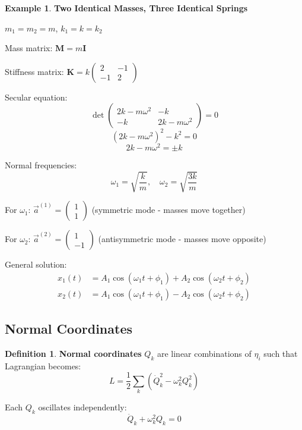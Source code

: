 \documentclass[12pt,a4paper]{article}
\theoremstyle{definition}
\newtheorem{definition}[theorem]{Definition}
\newtheorem{example}[theorem]{Example}
\begin{document}
\begin{example}
\textbf{Two Identical Masses, Three Identical Springs}

$m_1 = m_2 = m$, $k_1 = k = k_2$

Mass matrix: $\mathbf{M} = m\mathbf{I}$

Stiffness matrix: $\mathbf{K} = k\begin{pmatrix} 2 & -1 \\ -1 & 2 \end{pmatrix}$

Secular equation:
\[
\det\begin{pmatrix} 2k - m\omega^2 & -k \\ -k & 2k - m\omega^2 \end{pmatrix} = 0
\]
\[
(2k - m\omega^2)^2 - k^2 = 0
\]
\[
2k - m\omega^2 = \pm k
\]

Normal frequencies:
\[
\omega_1 = \sqrt{\frac{k}{m}}, \quad \omega_2 = \sqrt{\frac{3k}{m}}
\]

For $\omega_1$: $\vec{a}^{(1)} = \begin{pmatrix} 1 \\ 1 \end{pmatrix}$ (symmetric mode - masses move together)

For $\omega_2$: $\vec{a}^{(2)} = \begin{pmatrix} 1 \\ -1 \end{pmatrix}$ (antisymmetric mode - masses move opposite)

General solution:
\begin{align}
x_1(t) &= A_1\cos(\omega_1 t + \phi_1) + A_2\cos(\omega_2 t + \phi_2) \\
x_2(t) &= A_1\cos(\omega_1 t + \phi_1) - A_2\cos(\omega_2 t + \phi_2)
\end{align}
\end{example}

\subsection{Normal Coordinates}

\begin{definition}
\textbf{Normal coordinates} $Q_k$ are linear combinations of $\eta_i$ such that Lagrangian becomes:
\[
L = \frac{1}{2}\sum_k (\dot{Q}_k^2 - \omega_k^2 Q_k^2)
\]

Each $Q_k$ oscillates independently:
\[
\ddot{Q}_k + \omega_k^2 Q_k = 0
\]
\end{definition}
\end{document}
